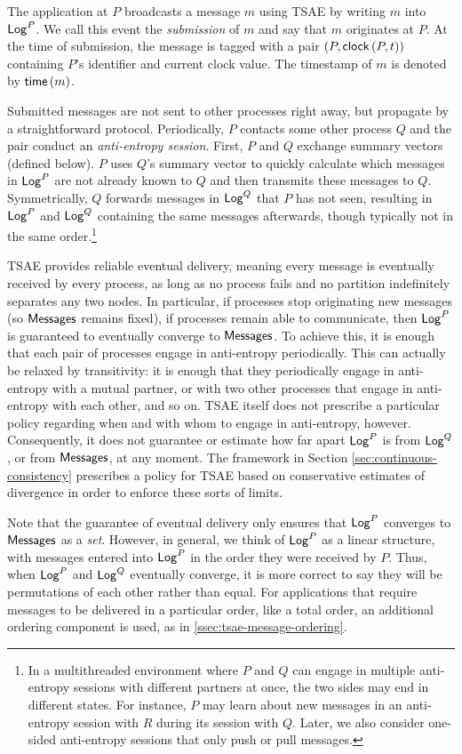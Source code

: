 \documentclass[]             %
{NASA}                       %
\theoremstyle{definition}
\begin{document}
The application at $P$ broadcasts a message $m$ using TSAE by writing
$m$ into $\mathsf{Log}^{P}$. We call this event the \emph{submission} of $m$ and
say that $m$ originates at $P$. At the time of submission, the message
is tagged with a pair $(P, \mathsf{clock}\left(P,t\right))$ containing $P$'s identifier
and current clock value. The timestamp of $m$ is denoted by
$\mathsf{time}\left(m\right)$.

Submitted messages are not sent to other processes right away, but
propagate by a straightforward protocol. Periodically, $P$ contacts
some other process $Q$ and the pair conduct an \emph{anti-entropy
  session}. First, $P$ and $Q$ exchange summary vectors (defined
below). $P$ uses $Q$'s summary vector to quickly calculate which
messages in $\mathsf{Log}^{P}$ are not already known to $Q$ and then transmits
these messages to $Q$. Symmetrically, $Q$ forwards messages in
$\mathsf{Log}^{Q}$ that $P$ has not seen, resulting in $\mathsf{Log}^{P}$ and $\mathsf{Log}^{Q}$
containing the same messages afterwards, though typically not in the
same order.\footnote{In a multithreaded environment where $P$ and $Q$
  can engage in multiple anti-entropy sessions with different partners
  at once, the two sides may end in different states. For instance,
  $P$ may learn about new messages in an anti-entropy session with $R$
  during its session with $Q$. Later, we also consider one-sided
  anti-entropy sessions that only push or pull messages. }

TSAE provides reliable eventual delivery, meaning every message is
eventually received by every process, as long as no process fails and
no partition indefinitely separates any two nodes. In particular, if
processes stop originating new messages (so $\mathbf{\mathsf{Messages}}$ remains fixed), if
processes remain able to communicate, then $\mathsf{Log}^{P}$ is guaranteed to
eventually converge to $\mathbf{\mathsf{Messages}}$. To achieve this, it is enough that each
pair of processes engage in anti-entropy periodically. This can
actually be relaxed by transitivity: it is enough that they
periodically engage in anti-entropy with a mutual partner, or with two
other processes that engage in anti-entropy with each other, and so
on. TSAE itself does not prescribe a particular policy regarding when
and with whom to engage in anti-entropy, however. Consequently, it
does not guarantee or estimate how far apart $\mathsf{Log}^{P}$ is from
$\mathsf{Log}^{Q}$, or from $\mathbf{\mathsf{Messages}}$, at any moment. The framework in Section
\ref{sec:continuous-consistency} prescribes a policy for TSAE based on
conservative estimates of divergence in order to enforce these sorts
of limits.

Note that the guarantee of eventual delivery only ensures that
$\mathsf{Log}^{P}$ converges to $\mathbf{\mathsf{Messages}}$ as a \emph{set}. However, in general, we
think of $\mathsf{Log}^{P}$ as a linear structure, with messages entered into
$\mathsf{Log}^{P}$ in the order they were received by $P$. Thus, when $\mathsf{Log}^{P}$
and $\mathsf{Log}^{Q}$ eventually converge, it is more correct to say they will
be permutations of each other rather than equal. For applications that
require messages to be delivered in a particular order, like a total
order, an additional ordering component is used, as in
\ref{ssec:tsae-message-ordering}.
\end{document}
